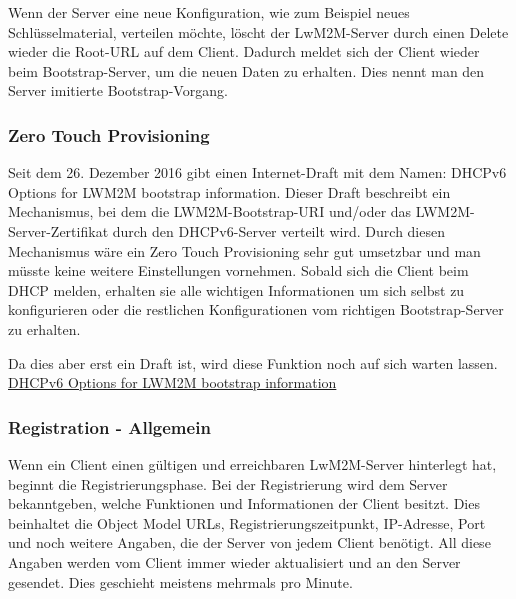 Wenn der Server eine neue Konfiguration, wie zum Beispiel neues Schlüsselmaterial, verteilen möchte, löscht der LwM2M-Server durch einen Delete wieder die Root-URL auf dem Client. Dadurch meldet sich der Client wieder beim Bootstrap-Server, um die neuen Daten zu erhalten. Dies nennt man den  Server imitierte Bootstrap-Vorgang.

\subsubsection{Zero Touch Provisioning}
Seit dem 26. Dezember 2016 gibt einen Internet-Draft mit dem Namen: DHCPv6 Options for LWM2M bootstrap information. Dieser Draft beschreibt ein Mechanismus, bei dem die LWM2M-Bootstrap-URI und/oder das LWM2M-Server-Zertifikat durch den DHCPv6-Server verteilt wird. Durch diesen Mechanismus wäre ein Zero Touch Provisioning sehr gut umsetzbar und man müsste keine weitere Einstellungen vornehmen. Sobald sich die Client beim DHCP melden, erhalten sie alle wichtigen Informationen um sich selbst zu konfigurieren oder die restlichen Konfigurationen vom richtigen Bootstrap-Server zu erhalten.

Da dies aber erst ein Draft ist, wird diese Funktion noch auf sich warten lassen. \\
\href{https://tools.ietf.org/html/draft-nalluri-dhc-dhcpv6-lwm2m-bootstrap-options-02}{DHCPv6 Options for LWM2M bootstrap information}

\subsubsection{Registration - Allgemein}
Wenn ein Client einen gültigen und erreichbaren LwM2M-Server hinterlegt hat, beginnt die Registrierungsphase. Bei der Registrierung wird dem Server bekanntgeben, welche Funktionen und Informationen der Client besitzt. Dies beinhaltet die Object Model URLs, Registrierungszeitpunkt, IP-Adresse, Port und noch weitere Angaben, die der Server von jedem Client benötigt. All diese Angaben werden vom Client immer wieder aktualisiert und an den Server gesendet. Dies geschieht meistens mehrmals pro Minute.

